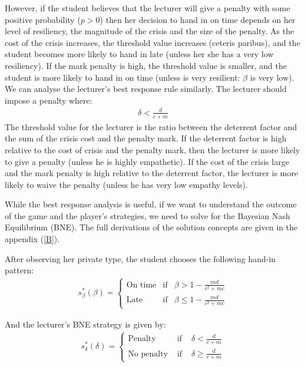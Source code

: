 \documentclass[11pt,preprint, authoryear]{elsarticle}
\numberwithin{equation}{section}
\numberwithin{figure}{section}
\numberwithin{table}{section}
\begin{document}
However, if the student believes that the lecturer will give a penalty
with some positive probability (\(p>0\)) then her decision to hand in on
time depends on her level of resiliency, the magnitude of the crisis and
the size of the penalty. As the cost of the crisis increases, the
threshold value increases (ceteris paribus), and the student becomes
more likely to hand in late (unless her she has a very low resiliency).
If the mark penalty is high, the threshold value is smaller, and the
student is more likely to hand in on time (unless is very resilient:
\(\beta\) is very low). We can analyse the lecturer's best response rule
similarly. The lecturer should impose a penalty where:\\
\begin{align*}
\delta<\frac{d}{c+m}
\end{align*} The threshold value for the lecturer is the ratio between
the deterrent factor and the sum of the crisis cost and the penalty
mark. If the deterrent factor is high relative to the cost of crisis and
the penalty mark, then the lecturer is more likely to give a penalty
(unless he is highly empathetic). If the cost of the crisis large and
the mark penalty is high relative to the deterrent factor, the lecturer
is more likely to waive the penalty (unless he has very low empathy
levels).

While the best response analysis is useful, if we want to understand the
outcome of the game and the player's strategies, we need to solve for
the Bayesian Nash Equilibrium (BNE). The full derivations of the
solution concepts are given in the appendix (\ref{B}).

After observing her private type, the student chooses the following
hand-in pattern:\\
\begin{align*}
s_{\beta}^{*}(\beta)=\left\{\begin{array}{lll}
\text{On time} & \text{if} & \beta>1-\frac{m d}{c^{2}+m c}  \\
\text{Late} & \text{if} & \beta \leq 1-\frac{m d}{c^{2}+m c} 
\end{array}\right.
\end{align*}

And the lecturer's BNE strategy is given by: \begin{align*}
s_{\delta}^{*}(\delta)=\left\{\begin{array}{lll}
\text{Penalty} & \text { if } & \delta<\frac{d}{c+m} \\
\text{No penalty} & \text { if } & \delta \geq \frac{d}{c+m}
\end{array}\right.
\end{align*}
\end{document}
